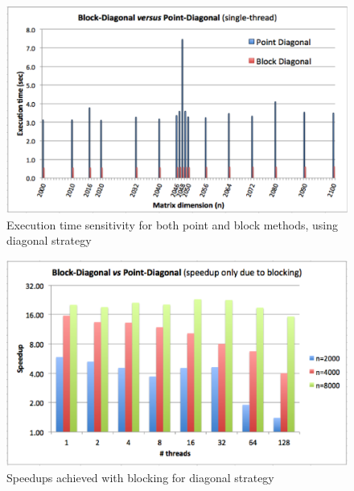\documentclass[../thesis]{subfiles}
\begin{document}
	\begin{figure}[p]
		\centering
		\includegraphics[height=0.25\textheight]{assets/images/multicore/matrix-variations.png}
		\caption{Execution time sensitivity for both point and block methods, using diagonal strategy}
		\label{fig:multicore:sensitivity}
	\end{figure}

	\begin{figure}[p]
		\centering
		\includegraphics[height=0.25\textheight]{assets/images/multicore/diagonal-speedup.png}
		\caption{Speedups achieved with blocking for diagonal strategy}
		\label{fig:multicore:block:diagonal:speedup}
	\end{figure}
\end{document}
